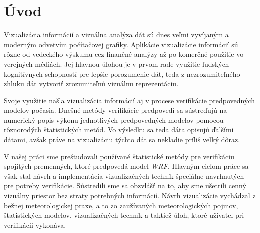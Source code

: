 \chapter*{Úvod}
	
Vizualizácia informácií a vizuálna analýza dát sú dnes veľmi vyvíjaným a moderným odvetvím počítačovej grafiky. Aplikácie vizualizácie informácií sú rôzne od vedeckého výskumu cez finančné analýzy až po komerčné použitie vo verejných médiách. Jej hlavnou úlohou je v prvom rade využitie ľudských kognitívnych schopností pre lepšie porozumenie dát, teda z nezrozumiteľného zhluku dát vytvoriť zrozumiteľnú vizuálnu reprezentáciu.

Svoje využitie našla vizualizácia informácií aj v procese verifikácie predpovedných modelov počasia. Dnešné metódy verifikácie predpovedí sa sústreďujú na numerický popis výkonu jednotlivých predpovedných modelov pomocou rôznorodých štatistických metód. Vo výsledku sa teda dáta opisujú ďalšími dátami, avšak práve na vizualizáciu týchto dát sa nekladie príliš veľký dôraz.

V našej práci sme preštudovali používané štatistické metódy pre verifikáciu spojitých premenných, ktoré predpovedá model \textit{WRF}. Hlavným cieľom práce sa však stal návrh a implementácia vizualizačných techník špeciálne navrhnutých pre potreby verifikácie. Sústredili sme sa obzvlášť na to, aby sme ušetrili cenný vizuálny priestor bez straty potrebných informácií. Návrh vizualizácie vychádzal z bežnej meteorologickej praxe, a to zo zaužívaných meteorologických pojmov, štatistických modelov, vizualizačných techník a taktiež úloh, ktoré užívateľ pri verifikácii vykonáva.
